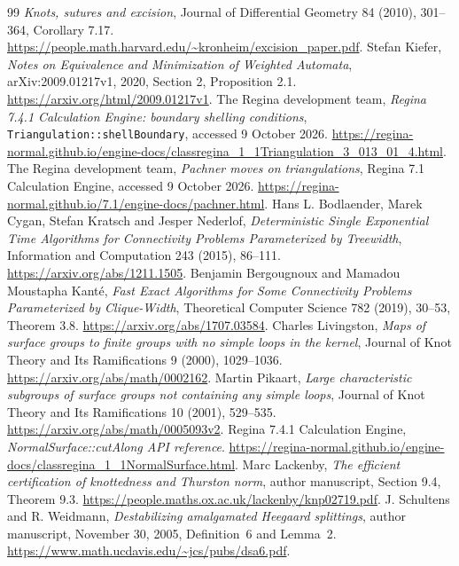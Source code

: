 \documentclass[11pt]{article}
\theoremstyle{remark}
\newcommand{\code}[1]{\texttt{#1}}
\begin{document}
\begin{thebibliography}{99}
\emph{Knots, sutures and excision}, Journal of Differential Geometry
84 (2010), 301--364, Corollary 7.17.
\url{https://people.math.harvard.edu/~kronheim/excision_paper.pdf}.
 Stefan Kiefer,
\emph{Notes on Equivalence and Minimization of Weighted Automata},
arXiv:2009.01217v1, 2020, Section 2, Proposition 2.1.
\url{https://arxiv.org/html/2009.01217v1}.
 The Regina development team,
\emph{Regina 7.4.1 Calculation Engine: boundary shelling conditions},
\code{Triangulation::shellBoundary}, accessed 9 October 2026.
\url{https://regina-normal.github.io/engine-docs/classregina_1_1Triangulation_3_013_01_4.html}.
 The Regina development team,
\emph{Pachner moves on triangulations}, Regina 7.1 Calculation Engine,
accessed 9 October 2026.
\url{https://regina-normal.github.io/7.1/engine-docs/pachner.html}.
 Hans L. Bodlaender, Marek Cygan,
Stefan Kratsch and Jesper Nederlof,
\emph{Deterministic Single Exponential Time Algorithms for Connectivity
Problems Parameterized by Treewidth}, Information and Computation 243
(2015), 86--111. \url{https://arxiv.org/abs/1211.1505}.
 Benjamin Bergougnoux and
Mamadou Moustapha Kant\'e,
\emph{Fast Exact Algorithms for Some Connectivity Problems Parameterized by
Clique-Width}, Theoretical Computer Science 782 (2019), 30--53,
Theorem 3.8. \url{https://arxiv.org/abs/1707.03584}.
 Charles Livingston,
\emph{Maps of surface groups to finite groups with no simple loops in the kernel},
Journal of Knot Theory and Its Ramifications 9 (2000), 1029--1036.
\url{https://arxiv.org/abs/math/0002162}.
 Martin Pikaart,
\emph{Large characteristic subgroups of surface groups not containing any simple loops},
Journal of Knot Theory and Its Ramifications 10 (2001), 529--535.
\url{https://arxiv.org/abs/math/0005093v2}.
 Regina 7.4.1 Calculation Engine, \emph{NormalSurface::cutAlong API reference}. \url{https://regina-normal.github.io/engine-docs/classregina_1_1NormalSurface.html}.
 Marc Lackenby, \emph{The efficient certification of knottedness and Thurston norm}, author manuscript, Section 9.4, Theorem 9.3. \url{https://people.maths.ox.ac.uk/lackenby/knp02719.pdf}.
J. Schultens and R. Weidmann,
\emph{Destabilizing amalgamated Heegaard splittings}, author manuscript,
November 30, 2005, Definition~6 and Lemma~2.
\url{https://www.math.ucdavis.edu/~jcs/pubs/dsa6.pdf}.


\end{thebibliography}
\end{document}
